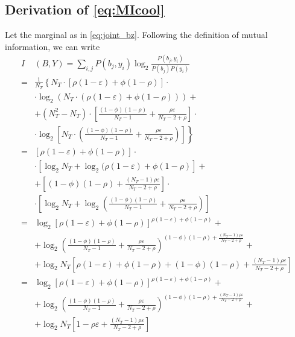 \subsection{Derivation of \eqref{eq:MIcool}}
\label{appendix:MI}
Let the marginal as in \eqref{eq:joint_bz}. Following the definition of mutual information, we can write
\begin{align}
    I&(B,Y) = \sum_{i,j} P(b_j,y_i) \log_2\frac{P(b_j,y_i)}{P(b_j)P(y_i)}\nonumber\\
    =&\frac{1}{N_T} \left\{ N_T \cdot\left[\rho (1 - \varepsilon) + \phi(1-\rho) \right] \cdot \right.\nonumber \\
    &\cdot \log_2 (N_T \cdot(\rho (1 - \varepsilon) + \phi(1-\rho))) +\nonumber \\
    &+ (N_T^2 - N_T) \cdot \left [\frac{(1-\phi)(1-\rho)}{N_T-1} + \frac{\rho\varepsilon}{N_T-2+\rho}\right ]\cdot\nonumber\\
    &\left .\cdot \log_2 \left[ N_T \cdot \left(\frac{(1-\phi)(1-\rho)}{N_T-1} + \frac{\rho\varepsilon}{N_T-2+\rho}\right)\right ] \right\}\nonumber\\
    =&\left[\rho (1 - \varepsilon) + \phi(1-\rho) \right] \cdot \nonumber\\
    &\cdot \left[\log_2 N_T + \log_2(\rho (1 - \varepsilon) + \phi(1-\rho)\right] + \nonumber\\
    &+ \left [(1-\phi)(1-\rho) + \frac{(N_T - 1)\rho\varepsilon}{N_T-2+\rho}\right ]\cdot\nonumber\\
    &\cdot \left[ \log_2 N_T + \log_2 \left(\frac{(1-\phi)(1-\rho)}{N_T-1} + \frac{\rho\varepsilon}{N_T-2+\rho}\right)\right ]\nonumber\\
    =&\log_2\left[\rho (1 - \varepsilon) + \phi(1-\rho)\right]^{\rho (1 - \varepsilon) + \phi(1-\rho)} +\nonumber\\
    &+ \log_2 \left(\frac{(1-\phi)(1-\rho)}{N_T-1} + \frac{\rho\varepsilon}{N_T-2+\rho}\right)^{(1-\phi)(1-\rho) + \frac{(N_T - 1)\rho\varepsilon}{N_T-2+\rho}}+\nonumber\\
    &+\log_2 N_T \left[\rho (1 - \varepsilon) + \phi(1-\rho) + (1-\phi)(1-\rho) + \frac{(N_T - 1)\rho\varepsilon}{N_T-2+\rho}\right ]\nonumber\\
    =&\log_2\left[\rho (1 - \varepsilon) + \phi(1-\rho)\right]^{\rho (1 - \varepsilon) + \phi(1-\rho)} + \nonumber\\
    &+ \log_2 \left(\frac{(1-\phi)(1-\rho)}{N_T-1} + \frac{\rho\varepsilon}{N_T-2+\rho}\right)^{(1-\phi)(1-\rho) + \frac{(N_T - 1)\rho\varepsilon}{N_T-2+\rho}}+\nonumber\\
    &+\log_2 N_T \left[1-\rho\varepsilon + \frac{(N_T - 1)\rho\varepsilon}{N_T-2+\rho}\right ]\label{eq:IBZA}\\
\end{align}
